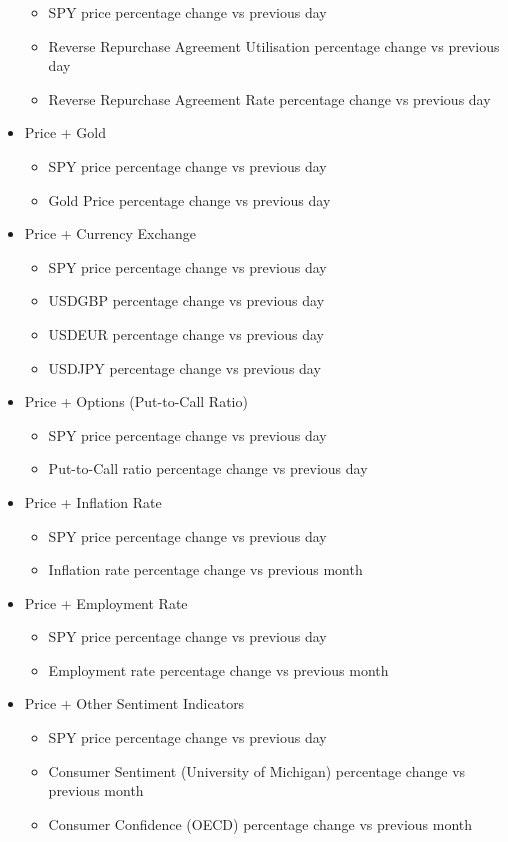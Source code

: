 \begin{itemize}
    \begin{itemize}
        \item SPY price percentage change vs previous day
        \item Reverse Repurchase Agreement Utilisation percentage change vs previous day
        \item Reverse Repurchase Agreement Rate percentage change vs previous day
    \end{itemize}
    \item Price + Gold
    \begin{itemize}
        \item SPY price percentage change vs previous day
        \item Gold Price percentage change vs previous day
    \end{itemize}
    \item Price + Currency Exchange
    \begin{itemize}
        \item SPY price percentage change vs previous day
        \item USDGBP percentage change vs previous day
        \item USDEUR percentage change vs previous day
        \item USDJPY percentage change vs previous day
    \end{itemize}
    \item Price + Options (Put-to-Call Ratio)
    \begin{itemize}
        \item SPY price percentage change vs previous day
        \item Put-to-Call ratio percentage change vs previous day
    \end{itemize}
    \item Price + Inflation Rate
    \begin{itemize}
        \item SPY price percentage change vs previous day
        \item Inflation rate percentage change vs previous month
    \end{itemize}
    \item Price + Employment Rate
    \begin{itemize}
        \item SPY price percentage change vs previous day
        \item Employment rate percentage change vs previous month
    \end{itemize}
    \item Price + Other Sentiment Indicators
    \begin{itemize}
        \item SPY price percentage change vs previous day
        \item Consumer Sentiment (University of Michigan) percentage change vs previous month
        \item Consumer Confidence (OECD) percentage change vs previous month
    \end{itemize}
\end{itemize}

